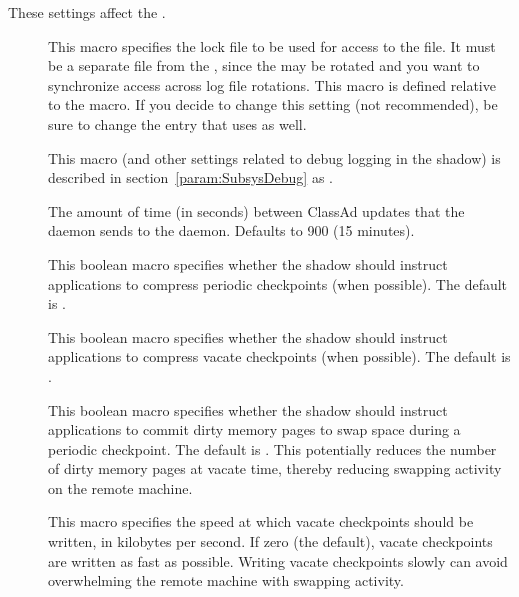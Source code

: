 These settings affect the .
\begin{description}

\item[] \label{param:ShadowLock} This macro
  specifies the lock file to be used for access to the
   file.  It must be a separate file from the
  , since the  may be rotated 
  and you want to synchronize access across log file rotations.
  This macro is defined relative to the  macro.
  If you decide to change this setting (not recommended),
  be sure to change the  entry that
   uses as well.

\item[] \label{param:ShadowDebug} This macro
  (and other settings related to debug logging in the shadow) is
  described in section~\ref{param:SubsysDebug} as
  .

\item[]
\label{param:ShadowQueueUpdateInterval}
The amount of time (in seconds) between ClassAd updates that the
 daemon sends to the  daemon.
Defaults to 900 (15 minutes).

\item[]
  \label{param:CompressPeriodicCkpt} This boolean macro specifies
  whether the shadow should instruct applications to compress periodic
  checkpoints (when possible).  The default is .

\item[]
  \label{param:CompressVacateCkpt} This boolean macro specifies
  whether the shadow should instruct applications to compress vacate
  checkpoints (when possible).  The default is .

\item[] \label{param:PeriodicMemorySync}
  This boolean macro specifies whether the shadow should instruct
  applications to commit dirty memory pages to swap space during a
  periodic checkpoint.  The default is .  This potentially
  reduces the number of dirty memory pages at vacate time, thereby
  reducing swapping activity on the remote machine.

\item[] \label{param:SlowCkptSpeed}  This
  macro specifies the speed at which vacate checkpoints should be
  written, in kilobytes per second.  If zero (the default), vacate
  checkpoints are written as fast as possible.  Writing vacate
  checkpoints slowly can avoid overwhelming the remote machine with
  swapping activity.


\end{description}
